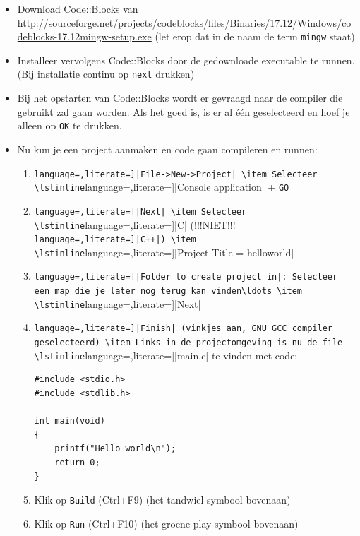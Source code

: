 \documentclass[a4paper,10pt,fleqn,twoside]{article}
\begin{document}
\begin{itemize}
\item Download Code::Blocks van \url{http://sourceforge.net/projects/codeblocks/files/Binaries/17.12/Windows/codeblocks-17.12mingw-setup.exe} (let erop dat in de naam de term \texttt{mingw} staat)
\item Installeer vervolgens Code::Blocks door de gedownloade executable te runnen. (Bij installatie continu op \texttt{next} drukken)
\item Bij het opstarten van Code::Blocks wordt er gevraagd naar de compiler die gebruikt zal gaan worden. Als het goed is, is er al \'e\'en geselecteerd en hoef je alleen op \texttt{OK} te drukken.
\item Nu kun je een project aanmaken en code gaan compileren en runnen:
\begin{enumerate}[label=\alph*.]
\item \lstinline[language=,literate=]|File->New->Project|
\item Selecteer \lstinline[language=,literate=]|Console application| + \lstinline|GO|
\item \lstinline[language=,literate=]|Next|
\item Selecteer \lstinline[language=,literate=]|C| (!!!NIET!!! \lstinline[language=,literate=]|C++|)
\item \lstinline[language=,literate=]|Project Title = helloworld|
\item \lstinline[language=,literate=]|Folder to create project in|: Selecteer een map die je later nog terug kan vinden\ldots
\item \lstinline[language=,literate=]|Next|
\item \lstinline[language=,literate=]|Finish| (vinkjes aan, GNU GCC compiler geselecteerd)
\item Links in de projectomgeving is nu de file \lstinline[language=,literate=]|main.c| te vinden met code:

\begin{lstlisting}
#include <stdio.h>
#include <stdlib.h>

int main(void)
{
    printf("Hello world\n");
    return 0;
}
\end{lstlisting}
\item Klik op \lstinline|Build| (Ctrl+F9) (het tandwiel symbool bovenaan)
\item Klik op \lstinline|Run| (Ctrl+F10) (het groene play symbool bovenaan)
\end{enumerate}
\end{itemize}
\end{document}
